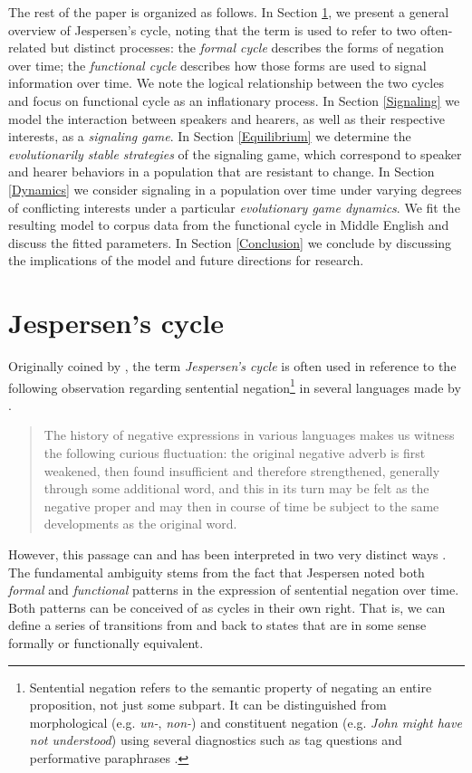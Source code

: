 \documentclass[linguex]{sp}
\theoremstyle{definition} \newtheorem{definition}{Definition}
\begin{document}
The rest of the paper is organized as follows. In Section \ref{Jespersen's cycle}, we present a general overview of Jespersen's cycle, noting that the term is used to refer to two often-related but distinct processes: the \emph{formal cycle} describes the forms of negation over time; the \emph{functional cycle} describes how those forms are used to signal information over time. We note the logical relationship between the two cycles and focus on functional cycle as an inflationary process. In Section \ref{Signaling} we model the interaction between speakers and hearers, as well as their respective interests, as a \emph{signaling game}. In Section \ref{Equilibrium} we determine the \emph{evolutionarily stable strategies} of the signaling game, which correspond to speaker and hearer behaviors in a population that are resistant to change. In Section \ref{Dynamics} we consider signaling in a population over time under varying degrees of conflicting interests under a particular \emph{evolutionary game dynamics}. We fit the resulting model to corpus data from the functional cycle in Middle English and discuss the fitted parameters. In Section \ref{Conclusion} we conclude by discussing the implications of the model and future directions for research.


\section{Jespersen's cycle}
\label{Jespersen's cycle}


Originally coined by \citet[88]{dahl:1979}, the term \emph{Jespersen's cycle} is often used in reference to the following observation regarding sentential negation\footnote{Sentential negation refers to the semantic property of negating an entire proposition, not just some subpart. It can be distinguished from morphological (e.g. \emph{un-}, \emph{non-}) and constituent negation (e.g. \emph{John might have not understood}) using several diagnostics such as tag questions \citep{klima1964}  and performative paraphrases \citep{payne1985}.} in several languages made by \citet[4]{jespersen:1917}.

\begin{quote}
The history of negative expressions in various languages makes us witness the following curious fluctuation: the original negative adverb is first weakened, then found insufficient and therefore strengthened, generally through some additional word, and this in its turn may be felt as the negative proper and may then in course of time be subject to the same developments as the original word.
\end{quote}
However, this passage can and has been interpreted in two very distinct ways \citep{vanderAuwera2009}. The fundamental ambiguity stems from the fact that Jespersen noted both \emph{formal} and \emph{functional} patterns in the expression of sentential negation over time. Both patterns can be conceived of as cycles in their own right. That is, we can define a series of transitions from and back to states that are in some sense formally or functionally equivalent. 
\end{document}
